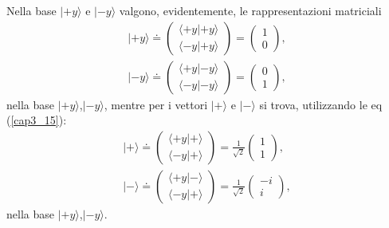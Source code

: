 Nella base $| +y \rangle $ e $| -y \rangle $ valgono, evidentemente, le rappresentazioni matriciali
	\begin{equation}
		\boxed{		
			\begin{array}{c}
			| +y \rangle \doteq 
			\begin{pmatrix}
			\langle +y | +y \rangle\\
			\langle -y | +y \rangle
			\end{pmatrix}=
			\begin{pmatrix}
			1\\
			0
			\end{pmatrix}, \\
			| -y \rangle \doteq 
			\begin{pmatrix}
			\langle +y | -y \rangle\\
			\langle -y | -y \rangle
			\end{pmatrix}=
			\begin{pmatrix}
			0\\
			1
			\end{pmatrix},
			\end{array} 
			}
	\end{equation}
nella base $| +y \rangle $,$| -y \rangle$, mentre per i vettori $| + \rangle $ e $| - \rangle$ si trova, utilizzando le eq (\ref{cap3_15}):
	\begin{equation}
		\boxed{
			\begin{array}{c}
			| + \rangle \doteq 
			\begin{pmatrix}
			\langle +y | + \rangle\\
			\langle -y | + \rangle
			\end{pmatrix}=
			\frac{1}{\sqrt{2}}
			\begin{pmatrix}
			1\\
			1
			\end{pmatrix} ,\\
			| - \rangle \doteq 
			\begin{pmatrix}
			\langle +y | - \rangle\\
			\langle -y | + \rangle
			\end{pmatrix}=
			\frac{1}{\sqrt{2}}
			\begin{pmatrix}
			-i\\
			i
			\end{pmatrix},
			\end{array} 
			}
	\label{cap3_16}
	\end{equation}
nella base $| +y \rangle $,$| -y \rangle$.\\

